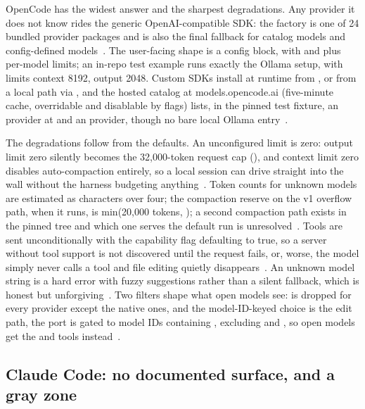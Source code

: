 \documentclass{article}
\newcommand{\occ}[0]{OpenCode}
\begin{document}
\occ{} has the widest answer and the sharpest degradations. Any provider
it does not know rides the generic OpenAI-compatible SDK: the factory is
one of 24 bundled provider packages and is also the final fallback for
catalog models and config-defined
models~\citep{opencodeRepo}. The user-facing shape is a config
block,  with  and
 plus per-model limits; an in-repo test example
runs exactly the Ollama setup, 
with limits context 8192, output 2048. Custom SDKs install at runtime
from , or from a local path via , and the hosted
catalog at models.opencode.ai (five-minute cache, overridable and
disablable by flags) lists, in the pinned test fixture, an
 provider at  and an
 provider, though no bare local Ollama
entry~\citep{opencodeRepo}.

The degradations follow from the defaults. An unconfigured limit is
zero: output limit zero silently becomes the 32{,}000-token request cap
(), and context limit zero disables
auto-compaction entirely, so a local session can drive straight into the
wall without the harness budgeting anything~\citep{opencodeRepo}. Token
counts for unknown models are estimated as characters over four; the
compaction reserve on the v1 overflow path, when it runs, is
min(20{,}000 tokens, ); a second compaction path
exists in the pinned tree and which one serves the default run is
unresolved~\citep{opencodeRepo}. Tools are sent unconditionally with the
capability flag defaulting to true, so a server without tool support is
not discovered until the request fails, or, worse, the model simply
never calls a tool and file editing quietly
disappears~\citep{opencodeRepo}. An unknown model string is a hard error
with fuzzy suggestions rather than a silent fallback, which is honest but
unforgiving~\citep{opencodeRepo}. Two filters shape what open models
see:  is dropped for every provider except the native
ones, and the model-ID-keyed choice is the edit path, the
 port is gated to model IDs containing ,
excluding  and , so open models get the
 and  tools instead~\citep{opencodeRepo}.

\subsection{Claude Code: no documented surface, and a gray zone}
\label{sec:ccc}
\end{document}
